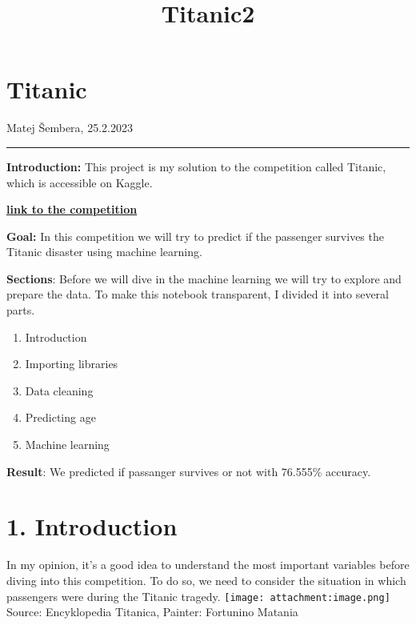 \documentclass[11pt]{article}
\title{Titanic2}
\providecommand{\tightlist}{%
      \setlength{\itemsep}{0pt}\setlength{\parskip}{0pt}}
\begin{document}
    
    \maketitle
    
    

    
    \hypertarget{titanic}{%
\section{Titanic}\label{titanic}}

Matej Šembera, 25.2.2023

\begin{center}\rule{0.5\linewidth}{0.5pt}\end{center}

\textbf{Introduction:} This project is my solution to the competition
called Titanic, which is accessible on Kaggle.

\textbf{\href{https://www.kaggle.com/competitions/titanic/overview}{link
to the competition}}

\textbf{Goal:} In this competition we will try to predict if the
passenger survives the Titanic disaster using machine learning.

\textbf{Sections}: Before we will dive in the machine learning we will
try to explore and prepare the data. To make this notebook transparent,
I divided it into several parts.

\begin{enumerate}
\def\labelenumi{\arabic{enumi}.}
\tightlist
\item
  Introduction
\item
  Importing libraries
\item
  Data cleaning
\item
  Predicting age
\item
  Machine learning
\end{enumerate}

\textbf{Result}: We predicted if passanger survives or not with 76.555\%
accuracy.

    \hypertarget{introduction}{%
\section{1. Introduction}\label{introduction}}

    In my opinion, it's a good idea to understand the most important
variables before diving into this competition. To do so, we need to
consider the situation in which passengers were during the Titanic
tragedy. \texttt{[image: attachment:image.png]} Source: Encyklopedia
Titanica, Painter: Fortunino Matania
\end{document}
